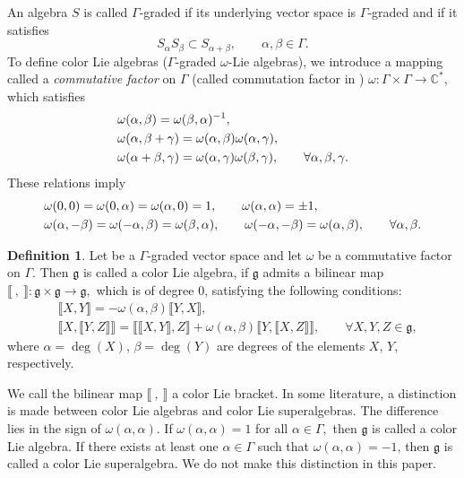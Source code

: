 \documentclass[pdftex]{sigma}
\numberwithin{equation}{section}
\theoremstyle{definition}
\newtheorem{Definition}[Theorem]{Definition}
\def\nn{\notag}
\def\g{\mathfrak{g}}
\begin{document}
An algebra $S$ is called $ \Gamma$-graded if its underlying vector space is $\Gamma$-graded and if it satisfies
\begin{equation*}
	S_{\alpha} S_{\beta} \subset S_{\alpha+\beta}, \qquad \alpha, \beta \in \Gamma.
\end{equation*}
To define color Lie algebras ($\Gamma$-graded $\omega$-Lie algebras), we introduce a mapping called a \textit{commutative factor} on $\Gamma$ (called commutation factor in \cite{scheu}) $ \omega \colon \Gamma \times \Gamma \to \mathbb{C}^{\ast}$, which satisfies
\begin{align}
	&\omega(\alpha,\beta)= \omega(\beta,\alpha)^{-1},
	\nn \\
	&\omega(\alpha,\beta+\gamma)= \omega(\alpha,\beta) \omega(\alpha,\gamma),
	\nn \\
	&\omega(\alpha+\beta,\gamma)= \omega(\alpha,\gamma) \omega(\beta,\gamma), \qquad
	\forall \alpha, \beta, \gamma.
	\label{omegaprop1}
\end{align}
These relations imply
\begin{align}
	&\omega(0,0)= \omega(0,\alpha) = \omega(\alpha,0) =1, \qquad \omega(\alpha,\alpha) = \pm 1,
	\nn\\
	&\omega(\alpha,-\beta)= \omega(-\alpha,\beta) = \omega(\beta,\alpha), \qquad
	\omega(-\alpha,-\beta) = \omega(\alpha,\beta), \qquad \forall \alpha, \beta.
	\label{omegaprop2}
\end{align}

\begin{Definition}
	Let \smash{$\g = \bigoplus_{\gamma\in\Gamma}\g_{\gamma}$} be a $\Gamma$-graded vector space and let $\omega$ be a commutative factor on $\Gamma.$
	Then $\g$ is called a color Lie algebra, if $\g$ admits a bilinear map
	$ \llbracket\ , \ \rrbracket\colon \g \times \g \to \g, $ which is of degree $0$, satisfying the following conditions:
	\begin{align}
		&\llbracket X,Y \rrbracket= -\omega(\alpha,\beta)\llbracket Y,X\rrbracket,
		\nonumber\\
		&\llbracket X, \llbracket Y, Z \rrbracket \rrbracket= \llbracket \llbracket X, Y \rrbracket, Z \rrbracket + \omega(\alpha,\beta) \llbracket Y, \llbracket X, Z \rrbracket \rrbracket,
		\qquad \forall X, Y, Z \in \g,
		\label{colorJacobi}
	\end{align}
	where $ \alpha = \deg(X)$, $\beta = \deg(Y)$ are degrees of the elements $ X$, $Y$, respectively.
\end{Definition}	

We call the bilinear map $ \llbracket\ , \ \rrbracket $ a color Lie bracket.
In some literature, a distinction is made between color Lie algebras and color Lie superalgebras.
The difference lies in the sign of $ \omega(\alpha,\alpha)$.
If $ \omega(\alpha,\alpha) = 1 $ for all $ \alpha \in \Gamma,$ then $\g$ is called a color Lie algebra. If there exists at least one $\alpha \in \Gamma$ such that $\omega(\alpha,\alpha) = -1$, then $\g$ is called a color Lie superalgebra. We do not make this distinction in this paper.
\end{document}
